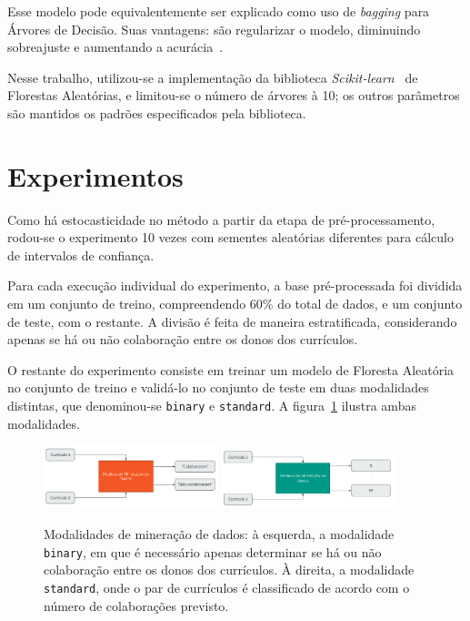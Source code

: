 \documentclass[12pt]{article}
\begin{document}
Esse modelo pode equivalentemente ser explicado como uso de \emph{bagging} para Árvores de Decisão.
Suas vantagens: são regularizar o modelo, diminuindo sobreajuste e aumentando a acurácia~\cite{random-forests}.

Nesse trabalho, utilizou-se a implementação da biblioteca \emph{Scikit-learn}~\cite{sklearn} de Florestas Aleatórias, e limitou-se o número de árvores à 10; os outros parâmetros são mantidos os padrões especificados pela biblioteca.

\section{Experimentos}
\label{sec:experiments}

Como há estocasticidade no método a partir da etapa de pré-processamento, rodou-se o experimento 10 vezes com sementes aleatórias diferentes para cálculo de intervalos de confiança. 

Para cada execução individual do experimento, a base pré-processada foi dividida em um conjunto de treino, compreendendo 60\% do total de dados, e um conjunto de teste, com o restante.
A divisão é feita de maneira estratificada, considerando apenas se há ou não colaboração entre os donos dos currículos.

O restante do experimento consiste em treinar um modelo de Floresta Aleatória no conjunto de treino e validá-lo no conjunto de teste em duas modalidades distintas, que denominou-se \texttt{binary} e \texttt{standard}.
A figura~\ref{fig:modalities} ilustra ambas modalidades.

\begin{figure}
  \begin{center}
    \includegraphics[width=0.45\textwidth]{images/binary.png}
    \hspace{10pt}
    \includegraphics[width=0.45\textwidth]{images/standard.png}
  \end{center}
  \vspace{-15pt}
  \caption{Modalidades de mineração de dados: à esquerda, a modalidade \texttt{binary}, em que é necessário apenas determinar se há ou não colaboração entre os donos dos currículos. À direita, a modalidade \texttt{standard}, onde o par de currículos é classificado de acordo com o número de colaborações previsto.}
  \label{fig:modalities}
\end{figure}
\end{document}
